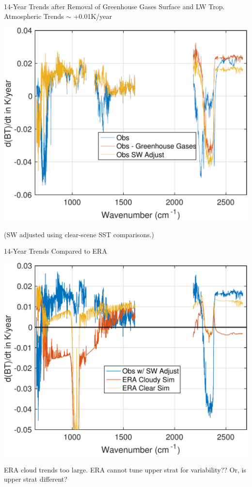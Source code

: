 \documentclass[10pt,t]{beamer}
\begin{document}
\begin{frame}[label={sec:orgda20d96}]{14-Year Trends after Removal of Greenhouse Gases}
\vspace{-0.1in}
Surface and LW Trop. Atmospheric Trends \(\sim\) +0.01K/year
\begin{center}
\includegraphics[width=0.8\linewidth]{./Figs/Pdf/global_dbt_l1c_minus_greenhouse_gases_swadjust.pdf}
\end{center}
\vspace{-0.1in}
\small
(SW adjusted using clear-scene SST comparisons.)
\end{frame}
\begin{frame}[label={sec:orgaa2b8d8}]{14-Year Trends Compared to ERA}
\vspace{-0.1in}
\begin{center}
\includegraphics[width=0.8\linewidth]{./Figs/Pdf/global_dbt_l1c_with_era_cld_and_clr.pdf}
\end{center}
\vspace{-0.1in}
\small
ERA cloud trends too large.  ERA cannot tune upper strat for \cd variability??  Or, is upper strat \cd different?
\end{frame}
\end{document}
